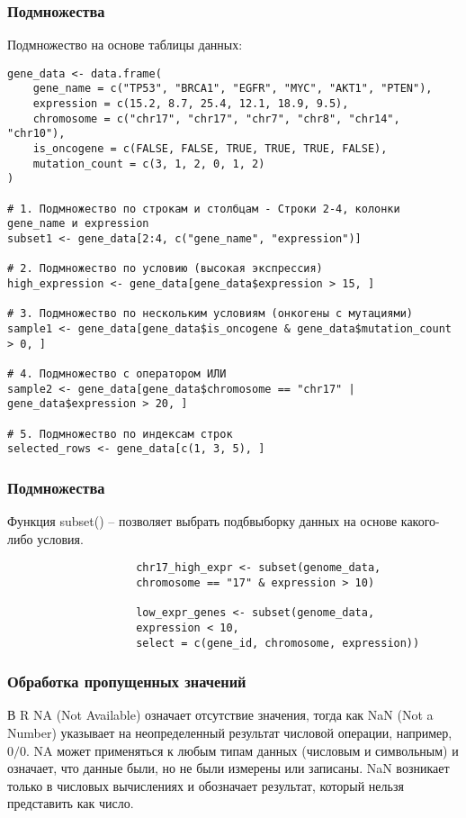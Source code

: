 \documentclass[10pt]{beamer}
\begin{document}
	\begin{frame}[fragile]
		\frametitle{Подмножества}
		Подмножество на основе таблицы данных:
		{\fontsize{7}{7}\selectfont
				\begin{verbatim}
gene_data <- data.frame(
    gene_name = c("TP53", "BRCA1", "EGFR", "MYC", "AKT1", "PTEN"),
    expression = c(15.2, 8.7, 25.4, 12.1, 18.9, 9.5),
    chromosome = c("chr17", "chr17", "chr7", "chr8", "chr14", "chr10"),
    is_oncogene = c(FALSE, FALSE, TRUE, TRUE, TRUE, FALSE),
    mutation_count = c(3, 1, 2, 0, 1, 2)
)
					
# 1. Подмножество по строкам и столбцам - Строки 2-4, колонки gene_name и expression
subset1 <- gene_data[2:4, c("gene_name", "expression")]
					
# 2. Подмножество по условию (высокая экспрессия)
high_expression <- gene_data[gene_data$expression > 15, ]
					
# 3. Подмножество по нескольким условиям (онкогены с мутациями)
sample1 <- gene_data[gene_data$is_oncogene & gene_data$mutation_count > 0, ]
					
# 4. Подмножество с оператором ИЛИ
sample2 <- gene_data[gene_data$chromosome == "chr17" | gene_data$expression > 20, ]
					
# 5. Подмножество по индексам строк
selected_rows <- gene_data[c(1, 3, 5), ]   \end{verbatim}
		}
		
		
	\end{frame}
	
	\begin{frame}[fragile]
		\frametitle{Подмножества}
		Функция subset() – позволяет выбрать подбвыборку данных на основе какого-либо условия.
		{\fontsize{8}{9}\selectfont
			
				\begin{verbatim}
					chr17_high_expr <- subset(genome_data, 
					chromosome == "17" & expression > 10)
					
					low_expr_genes <- subset(genome_data, 
					expression < 10, 
					select = c(gene_id, chromosome, expression))\end{verbatim}
			
		}
		
		
	\end{frame}
	
	
	\begin{frame}[fragile]
		\frametitle{Обработка пропущенных значений}
		В R NA (Not Available) означает отсутствие значения, тогда как NaN (Not a Number) указывает на неопределенный результат числовой операции, например, \(0/0\). NA может применяться к любым типам данных (числовым и символьным) и означает, что данные были, но не были измерены или записаны. NaN возникает только в числовых вычислениях и обозначает результат, который нельзя представить как число. 
		
		
	\end{frame}
	
\end{document}
